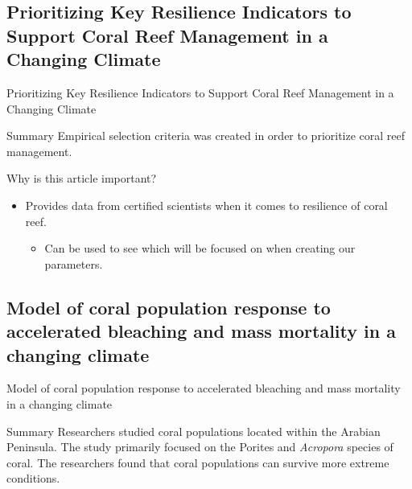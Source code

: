 \documentclass{beamer}
\begin{document}
\subsection{Prioritizing Key Resilience Indicators to Support Coral Reef Management in a Changing Climate}
\begin{frame}{Prioritizing Key Resilience Indicators to Support Coral Reef Management in a Changing Climate \cite{prioritize}}
    \begin{block}{Summary}
        Empirical selection criteria was created in order to prioritize coral reef management.
    \end{block}
    Why is this article important?
    \begin{itemize}
        \item Provides data from certified scientists when it comes to resilience of coral reef.
            \begin{itemize}
                \item Can be used to see which will be focused on when creating our parameters.
            \end{itemize}
    \end{itemize}
\end{frame}


\subsection{Model of coral population response to accelerated bleaching and mass
mortality in a changing climate}
\begin{frame}{Model of coral population response to accelerated bleaching and mass
mortality in a changing climate \cite{Riegl_Purkis_Model}}
    \begin{block}{Summary}
        Researchers studied coral populations located within the Arabian Peninsula. The study primarily focused on the Porites and \textit{Acropora} species of coral. The researchers found that coral populations can survive more extreme conditions.
    \end{block}
\end{frame}
\end{document}
